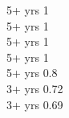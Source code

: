 
 {5+ yrs} {1} \\[-2pt]

 {5+ yrs} {1} \\[-2pt]

 {5+ yrs} {1} \\[-2pt]

 {5+ yrs} {1} \\[-2pt]

 {5+ yrs} {0.8} \\[-2pt]

 {3+ yrs} {0.72} \\[-2pt]

 {3+ yrs} {0.69} \\[-2pt]
